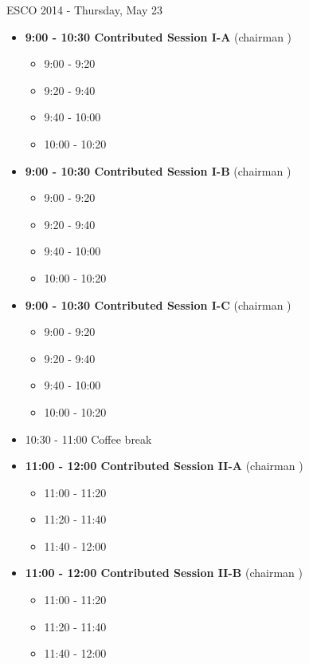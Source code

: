 \documentclass[10pt, A4]{article}
\begin{document}
\newpage
\newpage

\centerline{\huge ESCO 2014 - Thursday, May 23}
\vspace{4mm}

\begin{itemize}    
\item {\bf 9:00 - 10:30 Contributed Session I-A} (chairman ) 
  \begin{itemize}
    \item 9:00 - 9:20 
    \item 9:20 - 9:40 
    \item 9:40 - 10:00 
    \item 10:00 - 10:20  
  \end{itemize}
  \item {\bf 9:00 - 10:30 Contributed Session I-B} (chairman ) 
  \begin{itemize}
    \item 9:00 - 9:20 
    \item 9:20 - 9:40 
    \item 9:40 - 10:00 
    \item 10:00 - 10:20      
  \end{itemize}
    \item {\bf 9:00 - 10:30 Contributed Session I-C} (chairman ) 
  \begin{itemize}
    \item 9:00 - 9:20 
    \item 9:20 - 9:40 
    \item 9:40 - 10:00 
    \item 10:00 - 10:20      
  \end{itemize}
  \item 10:30 - 11:00 Coffee break
  \item {\bf 11:00 - 12:00 Contributed Session II-A} (chairman ) 
  \begin{itemize}
    \item 11:00 - 11:20 
    \item 11:20 - 11:40 
    \item 11:40 - 12:00 
  \end{itemize}
  \item {\bf 11:00 - 12:00 Contributed Session II-B} (chairman ) 
  \begin{itemize}
    \item 11:00 - 11:20 
    \item 11:20 - 11:40 
    \item 11:40 - 12:00  
  \end{itemize}

\end{itemize}
\end{document}
